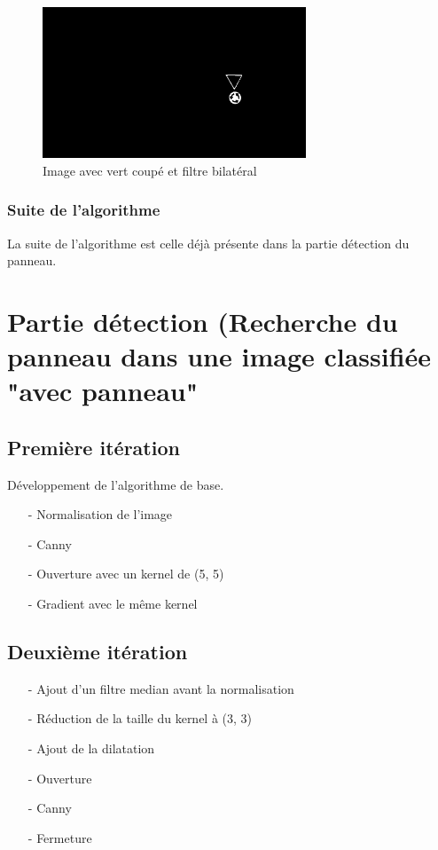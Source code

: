 \documentclass[a4paper,10pt,openany,oneside]{report}
\begin{document}
\begin{figure}[!h]
\centering
\includegraphics[width=0.7\textwidth]{../img/84-redblue.png}
\caption{Image avec vert coupé et filtre bilatéral}
\end{figure}

\subsubsection{Suite de l'algorithme}
La suite de l'algorithme est celle déjà présente dans la partie détection du panneau.


\section{Partie détection (Recherche du panneau dans une image classifiée "avec panneau"}
\subsection{Première itération}
Développement de l'algorithme de base. 
\begin{itemize}
\item[-] Normalisation de l'image
\item[-] Canny
\item[-] Ouverture avec un kernel de (5, 5)
\item[-] Gradient avec le même kernel
\end{itemize}

\subsection{Deuxième itération}
\begin{itemize}
\item[-] Ajout d'un filtre median avant la normalisation
\item[-] Réduction de la taille du kernel à (3, 3)
\item[-] Ajout de la dilatation
\item[-] Ouverture
\item[-] Canny
\item[-] Fermeture
\end{itemize}
\end{document}
